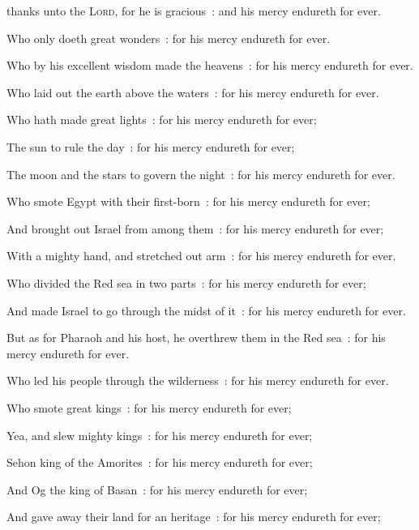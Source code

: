  thanks unto the \textsc{Lord}, for he is gracious~: and his mercy endureth for ever.\par
{}
Who only doeth great wonders~: for his mercy endureth for ever.\par
{}Who by his excellent wisdom made the heavens~: for his mercy endureth for ever.\par
{}Who laid out the earth above the waters~: for his mercy endureth for ever.\par
{}Who hath made great lights~: for his mercy endureth for ever;\par
{}The sun to rule the day~: for his mercy endureth for ever;\par
{}The moon and the stars to govern the night~: for his mercy endureth for ever.\par
{}Who smote Egypt with their first-born~: for his mercy endureth for ever;\par
{}And brought out Israel from among them~: for his mercy endureth for ever;\par
{}With a mighty hand, and stretched out arm~: for his mercy endureth for ever.\par
{}Who divided the Red sea in two parts~: for his mercy endureth for ever;\par
{}And made Israel to go through the midst of it~: for his mercy endureth for ever.\par
{}But as for Pharaoh and his host, he overthrew them in the Red sea~: for his mercy endureth for ever.\par
{}Who led his people through the wilderness~: for his mercy endureth for ever.\par
{}Who smote great kings~: for his mercy endureth for ever;\par
{}Yea, and slew mighty kings~: for his mercy endureth for ever;\par
{}Sehon king of the Amorites~: for his mercy endureth for ever;\par
{}And Og the king of Basan~: for his mercy endureth for ever;\par
{}And gave away their land for an heritage~: for his mercy endureth for ever;\par
